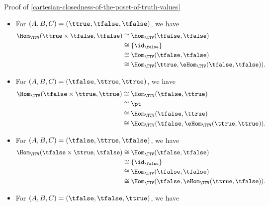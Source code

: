 \begin{Proof}{Proof of \cref{cartesian-closedness-of-the-poset-of-truth-values}}
\begin{itemize}
\begin{align*}
                                                          &\cong \Hom_{\TTV}(\tfalse,\ttrue)\\
                                                          &\cong \Hom_{\TTV}(\tfalse,\eHom_{\TTV}(\tfalse,\ttrue)).
            \end{align*}
        \item For $(A,B,C)=(\ttrue,\tfalse,\tfalse)$, we have
            \begin{align*}
                \Hom_{\TTV}(\ttrue\times\tfalse,\tfalse)  &\cong \Hom_{\TTV}(\tfalse,\tfalse)\\
                                                          &\cong \{\id_{\false}\}\\
                                                          &\cong \Hom_{\TTV}(\tfalse,\tfalse)\\
                                                          &\cong \Hom_{\TTV}(\ttrue,\eHom_{\TTV}(\tfalse,\tfalse)).
            \end{align*}
        \item For $(A,B,C)=(\tfalse,\ttrue,\ttrue)$, we have
            \begin{align*}
                \Hom_{\TTV}(\tfalse\times\ttrue,\ttrue)   &\cong \Hom_{\TTV}(\tfalse,\ttrue)\\
                                                          &\cong \pt\\
                                                          &\cong \Hom_{\TTV}(\tfalse,\ttrue)\\
                                                          &\cong \Hom_{\TTV}(\tfalse,\eHom_{\TTV}(\ttrue,\ttrue)).
            \end{align*}
        \item For $(A,B,C)=(\tfalse,\ttrue,\tfalse)$, we have
            \begin{align*}
                \Hom_{\TTV}(\tfalse\times\ttrue,\tfalse)  &\cong \Hom_{\TTV}(\tfalse,\tfalse)\\
                                                          &\cong \{\id_{\false}\}\\
                                                          &\cong \Hom_{\TTV}(\tfalse,\tfalse)\\
                                                          &\cong \Hom_{\TTV}(\tfalse,\eHom_{\TTV}(\ttrue,\tfalse)).
            \end{align*}
        \item For $(A,B,C)=(\tfalse,\tfalse,\ttrue)$, we have

\end{itemize}
\end{Proof}
